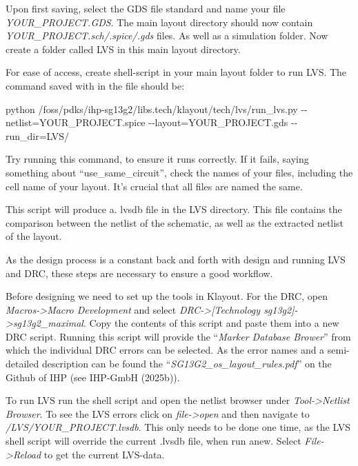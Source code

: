 \documentclass[
  letterpaper,
]{scrbook}
\newenvironment{Shaded}{}{}
\newcommand{\NormalTok}[1]{\textcolor[rgb]{0.14,0.16,0.18}{#1}}
\begin{document}
Upon first saving, select the GDS file standard and name your file
\emph{YOUR\_PROJECT.GDS}. The main layout directory should now contain
\emph{YOUR\_PROJECT.sch/.spice/.gds} files. As well as a simulation
folder. Now create a folder called LVS in this main layout directory.

For ease of access, create shell-script in your main layout folder to
run LVS. The command saved with in the file should be:\\

\begin{Shaded}
\begin{Highlighting}[]
\NormalTok{python /foss/pdks/ihp{-}sg13g2/libs.tech/klayout/tech/lvs/run\_lvs.py {-}{-}netlist=YOUR\_PROJECT.spice {-}{-}layout=YOUR\_PROJECT.gds {-}{-}run\_dir=LVS/}
\end{Highlighting}
\end{Shaded}

Try running this command, to ensure it runs correctly. If it fails,
saying something about ``use\_same\_circuit'', check the names of your
files, including the cell name of your layout. It's crucial that all
files are named the same.

This script will produce a. lvsdb file in the LVS directory. This file
contains the comparison between the netlist of the schematic, as well as
the extracted netlist of the layout.

As the design process is a constant back and forth with design and
running LVS and DRC, these steps are necessary to ensure a good
workflow.

Before designing we need to set up the tools in Klayout. For the DRC,
open \emph{Macros-\textgreater Macro Development} and select
\emph{DRC-\textgreater{[}Technology
sg13g2{]}-\textgreater sg13g2\_maximal}. Copy the contents of this
script and paste them into a new DRC script. Running this script will
provide the ``\emph{Marker Database Brower}'' from which the individual
DRC errors can be selected. As the error names and a semi-detailed
description can be found the ``\emph{SG13G2\_os\_layout\_rules.pdf}'' on
the Github of IHP (see IHP‑GmbH (2025b)).

To run LVS run the shell script and open the netlist browser under
\emph{Tool-\textgreater Netlist Browser}. To see the LVS errors click on
\emph{file-\textgreater open} and then navigate to
\emph{/LVS/YOUR\_PROJECT.lvsdb}. This only needs to be done one time, as
the LVS shell script will override the current .lvsdb file, when run
anew. Select \emph{File-\textgreater Reload} to get the current
LVS-data.
\end{document}
